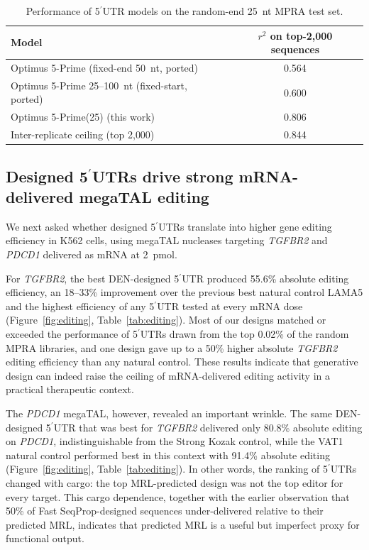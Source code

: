 \documentclass[11pt]{article}
\begin{document}
\begin{table}[htbp]
\centering
\caption{Performance of 5$^\prime$UTR models on the random-end 25~nt
MPRA test set.}
\label{tab:model_perf}
\begin{tabular}{lc}
\toprule
Model & $r^{2}$ on top-2{,}000 sequences \\
\midrule
Optimus 5-Prime (fixed-end 50~nt, ported) & 0.564 \\
Optimus 5-Prime 25--100~nt (fixed-start, ported) & 0.600 \\
Optimus 5-Prime(25) (this work) & 0.806 \\
\midrule
Inter-replicate ceiling (top 2{,}000) & 0.844 \\
\bottomrule
\end{tabular}
\end{table}

\subsection{Designed 5$^\prime$UTRs drive strong mRNA-delivered megaTAL editing}

We next asked whether designed 5$^\prime$UTRs translate into higher
gene editing efficiency in K562 cells, using megaTAL nucleases
targeting \emph{TGFBR2} and \emph{PDCD1} delivered as mRNA at 2~pmol.

For \emph{TGFBR2}, the best DEN-designed 5$^\prime$UTR produced
55.6\% absolute editing efficiency, an 18--33\% improvement over the
previous best natural control LAMA5 and the highest efficiency of any
5$^\prime$UTR tested at every mRNA dose (Figure~\ref{fig:editing},
Table~\ref{tab:editing}). Most of our designs matched or exceeded the
performance of 5$^\prime$UTRs drawn from the top 0.02\% of the random
MPRA libraries, and one design gave up to a 50\% higher absolute
\emph{TGFBR2} editing efficiency than any natural control. These
results indicate that generative design can indeed raise the ceiling
of mRNA-delivered editing activity in a practical therapeutic context.

The \emph{PDCD1} megaTAL, however, revealed an important wrinkle. The
same DEN-designed 5$^\prime$UTR that was best for \emph{TGFBR2}
delivered only 80.8\% absolute editing on \emph{PDCD1}, indistinguishable
from the Strong Kozak control, while the VAT1 natural control performed
best in this context with 91.4\% absolute editing
(Figure~\ref{fig:editing}, Table~\ref{tab:editing}). In other words,
the ranking of 5$^\prime$UTRs changed with cargo: the top MRL-predicted
design was not the top editor for every target. This cargo dependence,
together with the earlier observation that 50\% of
Fast SeqProp-designed sequences under-delivered relative to their
predicted MRL, indicates that predicted MRL is a useful but imperfect
proxy for functional output.
\end{document}
